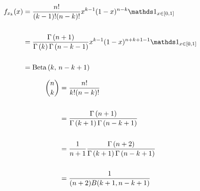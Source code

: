 \documentclass[12pt]{article}
\begin{document}
\begin{enumerate}
\begin{align*}
    f_{x_k}(x) &= \frac{n!}{(k-1)!(n-k)!} x^{k-1}(1-x)^{n-k} \indic{x \in [0, 1]} \\ \\ 
    &= \frac{\Gammaf{n+1}}{\Gammaf{k}\Gammaf{n-k-1}} x^{k-1} (1-x)^{n+k+1-1} \indic{x \in [0, 1]}  \\ \\ 
    &= \betanot{k}{n-k+1}
\end{align*}


\begin{align*}
    \binom{n}{k} &= \frac{n!}{k!(n-k)!} \\ \\ 
    &= \frac{\Gamma\left(n+1\right)}{\Gamma\left(k+1\right) \Gamma\left(n-k+1\right)} \\  \\ 
    &= \frac{1}{n+1} \frac{\Gamma\left(n+2\right)}{\Gamma\left(k+1\right) \Gamma\left(n-k+1\right)} \\ \\ 
    &= \frac{1}{(n+2)B(k+1, n-k+1)}
\end{align*}



%
%
%
%
%
%
%
%
%
%
%

\end{enumerate}
\end{document}
